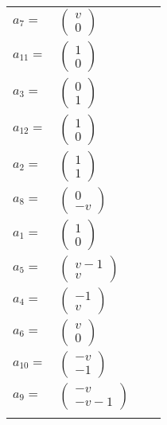 \documentclass[1p]{elsarticle_modified}
\theoremstyle{definition}
\begin{document}
\begin{tabular}{m{7pt} m{180pt} m{7pt} m{180pt} }
\flushright $a_{7}=$&$\begin{pmatrix}v\\0\end{pmatrix}$ \\
\flushright $a_{11}=$&$\begin{pmatrix}1\\0\end{pmatrix}$ \\
\flushright $a_{3}=$&$\begin{pmatrix}0\\1\end{pmatrix}$ \\
\flushright $a_{12}=$&$\begin{pmatrix}1\\0\end{pmatrix}$ \\
\flushright $a_{2}=$&$\begin{pmatrix}1\\1\end{pmatrix}$ \\
\flushright $a_{8}=$&$\begin{pmatrix}0\\- v\end{pmatrix}$ \\
\flushright $a_{1}=$&$\begin{pmatrix}1\\0\end{pmatrix}$ \\
\flushright $a_{5}=$&$\begin{pmatrix}v-1\\v\end{pmatrix}$ \\
\flushright $a_{4}=$&$\begin{pmatrix}-1\\v\end{pmatrix}$ \\
\flushright $a_{6}=$&$\begin{pmatrix}v\\0\end{pmatrix}$ \\
\flushright $a_{10}=$&$\begin{pmatrix}- v\\-1\end{pmatrix}$ \\
\flushright $a_{9}=$&$\begin{pmatrix}- v\\- v-1\end{pmatrix}$\\&\end{tabular}
\end{document}
